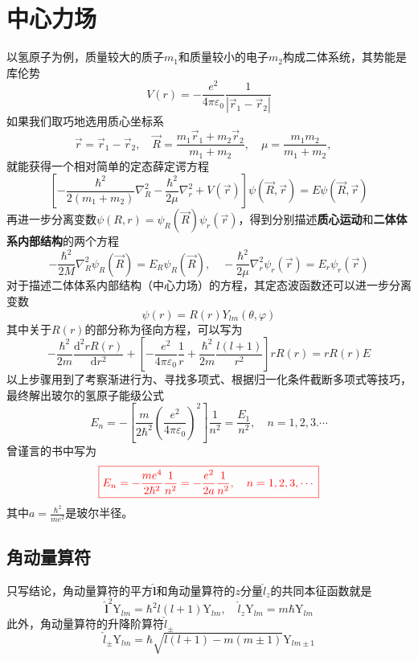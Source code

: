 \section{中心力场}
以氢原子为例，质量较大的质子$m_1$和质量较小的电子$m_2$构成二体系统，其势能是库伦势
$$
    V(r)=-\frac{e^2}{4\pi\varepsilon_0}\frac{1}{|\vec{r}_1-\vec{r}_2|}
$$
如果我们取巧地选用质心坐标系
$$
    \vec{r}=\vec{r}_1-\vec{r}_2, \quad
    \vec{R}=\frac{m_1\vec{r}_1+m_2\vec{r}_2}{m_1+m_2}, \quad
    \mu=\frac{m_1m_2}{m_1+m_2}, \quad
$$
就能获得一个相对简单的定态薛定谔方程
$$
    \left[-\frac{\hbar^2}{2(m_1+m_2)}\nabla_R^2-\frac{\hbar^2}{2\mu}\nabla_r^2+V(\vec{r})\right]\psi(\vec{R}, \vec{r})=E\psi(\vec{R}, \vec{r})
$$
再进一步分离变数$\psi(R, r)=\psi_R(\vec{R})\psi_r(\vec{r})$，得到分别描述\textbf{质心运动}和\textbf{二体体系内部结构}的两个方程
$$
    -\frac{\hbar^2}{2M}\nabla_R^2\psi_R(\vec{R})=E_R\psi_R(\vec{R}), \quad
    -\frac{\hbar^2}{2\mu}\nabla_r^2\psi_r(\vec{r})=E_r\psi_r(\vec{r})
$$
对于描述二体体系内部结构（中心力场）的方程，其定态波函数还可以进一步分离变数
$$
    \psi(r)=R(r)Y_{lm}(\theta, \varphi)
$$
其中关于$R(r)$的部分称为径向方程，可以写为
$$
    -\frac{\hbar^2}{2m}\frac{\mathrm{d}^2rR(r)}{\mathrm{d}r^2}+\left[-\frac{e^2}{4\pi\varepsilon_0}\frac{1}{r}+\frac{\hbar^2}{2m}\frac{l(l+1)}{r^2}\right]rR(r)=rR(r)E
$$
以上步骤用到了考察渐进行为、寻找多项式、根据归一化条件截断多项式等技巧，最终解出玻尔的氢原子能级公式
$$
    E_n=-\left[\frac{m}{2\hbar^2}\left(\frac{e^2}{4\pi\varepsilon_0}\right)^2 \right]\frac{1}{n^2}=\frac{E_1}{n^2}, \quad n=1,2,3.\cdots
$$
曾谨言的书中写为
$$
    \color{red}\boxed{
        E_n=-\frac{me^4}{2\hbar^2}\frac{1}{n^2}=-\frac{e^2}{2a}\frac{1}{n^2},\quad n=1,2,3,\cdots
    }
$$
其中$a=\frac{\hbar^2}{me^2}$是玻尔半径。
\subsection{角动量算符}
只写结论，角动量算符的平方$\hat{\boldsymbol{l}}$和角动量算符的$z$分量$\hat{l}_z$的共同本征函数就是
$$
    \hat{\boldsymbol{l}}^2\mathrm{Y}_{lm}=\hbar^2l(l+1)\mathrm{Y}_{lm}, \quad
    \hat{l}_z\mathrm{Y}_{lm}=m\hbar\mathrm{Y}_{lm}
$$
此外，角动量算符的升降阶算符$\hat{l}_{\pm}$
$$
    \hat{l}_{\pm}\mathrm{Y}_{lm}=\hbar\sqrt{l(l+1)-m(m \pm 1)}\mathrm{Y}_{lm \pm 1}
$$


